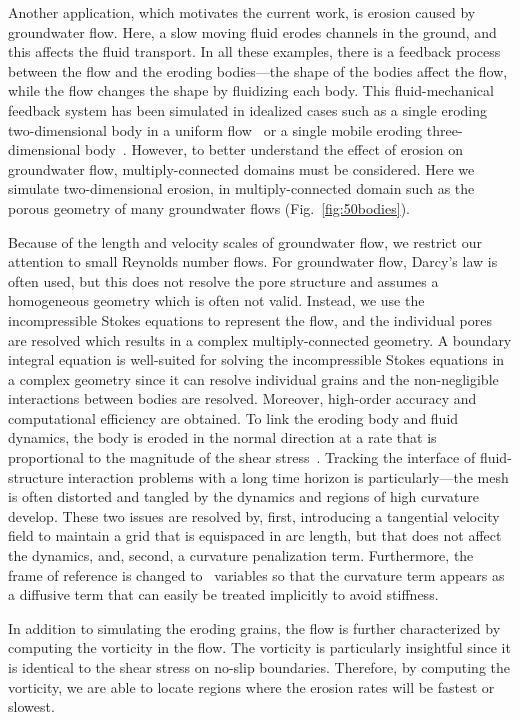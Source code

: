 \documentclass[preprint, 10pt]{elsarticle}
\begin{document}
Another application, which motivates the current work, is erosion caused by groundwater flow.
Here, a slow moving fluid erodes channels in the ground, and this
affects the fluid transport.  In all these examples, there is a feedback
process between the flow and the eroding bodies---the shape of the
bodies affect the flow, while the flow changes the shape by fluidizing
each body.  This fluid-mechanical feedback system has been simulated in
idealized cases such as a single eroding two-dimensional body in a
uniform flow~\cite{moo-ris-chi-zha-she2013} or a single mobile eroding
three-dimensional body~\cite{mit-spa2016}. However, to better understand
the effect of erosion on groundwater flow, multiply-connected domains
must be considered.  Here we simulate two-dimensional erosion, in
multiply-connected domain such as the porous geometry of many
groundwater flows (Fig.~\ref{fig:50bodies}).

Because of the length and velocity scales of groundwater flow, we
restrict our attention to small Reynolds number flows.  For groundwater
flow, Darcy's law is often used, but this does not resolve the pore
structure and assumes a homogeneous geometry which is often not valid.
Instead, we use the incompressible Stokes equations to represent the
flow, and the individual pores are resolved which results in a complex
multiply-connected geometry.  A boundary integral equation is
well-suited for solving the incompressible Stokes equations in a complex
geometry since it can resolve individual grains and the non-negligible
interactions between bodies are resolved. Moreover, high-order accuracy
and computational efficiency are obtained. To link the eroding body and
fluid dynamics, the body is eroded in the normal direction at a rate
that is proportional to the magnitude of the shear
stress~\cite{ris-moo-chi-she-zha2012}.  Tracking the interface of
fluid-structure interaction problems with a long time horizon is
particularly---the mesh is often distorted and tangled by the dynamics
and regions of high curvature develop.  These two issues are resolved
by, first, introducing a tangential velocity field to maintain a grid
that is equispaced in arc length, but that does not affect the dynamics,
and, second, a curvature penalization term.  Furthermore, the frame of
reference is changed to \thL~variables so that the curvature term
appears as a diffusive term that can easily be treated implicitly
to avoid stiffness.

In addition to simulating the eroding grains, the flow is further
characterized by computing the vorticity in the flow.  The vorticity is
particularly insightful since it is identical to the shear stress on
no-slip boundaries.  Therefore, by computing the
vorticity, we are able to locate regions where the erosion rates will be
fastest or slowest.
\end{document}
